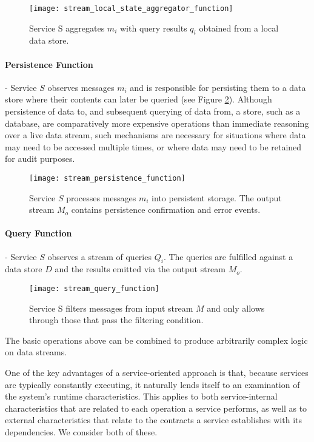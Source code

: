 \begin{figure}[H]
\texttt{[image: stream\_local\_state\_aggregator\_function]}
\centering
\caption {Service S aggregates $m_i$ with query results $q_i$ obtained from a local data store.}
\label{fig:stream_local_state_aggregator_function}
\end{figure}


\paragraph{Persistence Function} - Service $S$ observes messages $m_i$ and is responsible for persisting them to a data store where their contents can later be queried (see Figure \ref{fig:stream_persistence_function}). Although persistence of data to, and subsequent querying of data from, a store, such as a database, are comparatively more expensive operations than immediate reasoning over a live data stream, such mechanisms are necessary for situations where data may need to be accessed multiple times, or where data may need to be retained for audit purposes.

\begin{figure}[H]
\texttt{[image: stream\_persistence\_function]}
\centering
\caption {Service $S$ processes messages $m_i$ into persistent storage. The output stream $M_o$ contains persistence confirmation and error events.}
\label{fig:stream_persistence_function}
\end{figure}

\paragraph{Query Function} - Service $S$ observes a stream of queries $Q_i$. The queries are fulfilled against a data store $D$ and the results emitted via the output stream $M_o$.

\begin{figure}[H]
\texttt{[image: stream\_query\_function]}
\centering
\caption {Service S filters messages from input stream $M$ and only allows through those that pass the filtering condition.}
\label{fig:stream_query_function}
\end{figure}

The basic operations above can be combined to produce arbitrarily complex logic on data streams.

One of the key advantages of a service-oriented approach is that, because services are typically constantly executing, it naturally lends itself to an examination of the system's runtime characteristics. This applies to both service-internal characteristics that are related to each operation a service performs, as well as to external characteristics that relate to the contracts a service establishes with its dependencies. We consider both of these.

